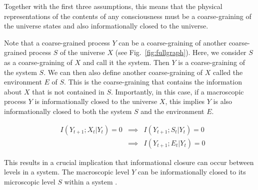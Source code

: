 \documentclass[utf8]{article}
\begin{document}
        Together with the first three assumptions, this means that the physical representations of the contents of any consciousness must be a coarse-graining of the universe states and also informationally closed to the universe.
        
        Note that a coarse-grained process $Y$ can be a coarse-graining of another coarse-grained process $S$ of the universe $X$ (see Fig.~\ref{fig:fullgraph}). Here, we consider $S$ as a coarse-graining of $X$ and call it the system. Then $Y$ is a coarse-graining of the system $S$. We can then also define another coarse-graining of $X$ called the environment $E$ of $S$. This is the coarse-graining that contains the information about $X$ that is not contained in $S$. Importantly, in this case, if a macroscopic process $Y$ is informationally closed to the universe $X$, this implies $Y$ is also informationally closed to both the system $S$ and the environment $E$. 
        
		\begin{equation}
			\label{eq:ICchain}
			\begin{aligned}
		    & I(Y_{t+1};X_t|Y_{t})=0 & \implies & I(Y_{t+1};S_t|Y_{t})=0 \\
		    & {} & \implies & I(Y_{t+1};E_t|Y_{t})=0
			\end{aligned}
		\end{equation}
		
        
        This results in a crucial implication that informational closure can occur between levels in a system. The macroscopic level $Y$ can be informationally closed to its microscopic level $S$ within a system \citep{PFANTE.2014}.
\end{document}
